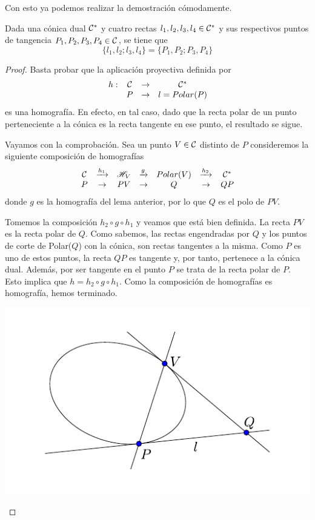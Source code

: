 Con esto ya podemos realizar la demostración cómodamente.
\begin{prop}
		Dada una cónica dual $\mathcal{C}^*$ y cuatro rectas $l_1,l_2,l_3,l_4\in\mathcal{C}^*$ y sus respectivos puntos de tangencia $P_1,P_2,P_3,P_4\in\mathcal{C}$, se tiene que 
		\begin{equation}
		\{l_1,l_2;l_3,l_4\}=\{P_1,P_2;P_3,P_4\}
		\end{equation}
\end{prop}
\begin{proof}
	Basta probar que la aplicación proyectiva definida por
	\begin{equation*}
		\begin{array}{cccc}
			h:&\mathcal{C}&\rightarrow &\mathcal{C}^*\\
			& P&\rightarrow &l=Polar(P)
		\end{array}
	\end{equation*}
	es una homografía. En efecto, en tal caso, dado que la recta polar de un punto perteneciente a la cónica es la recta tangente en ese punto, el resultado se sigue.
	
	Vayamos con la comprobación. Sea un punto $V\in\mathcal{C}$ distinto de $P$ consideremos la siguiente composición de homografías
	\begin{equation*}
		\begin{array}{ccccccc}
			\mathcal{C}&\xrightarrow{h_1}&\mathscr{H}_V&\xrightarrow{g}& Polar(V)&\xrightarrow{h_2}&\mathcal{C}^*\\
			P&\rightarrow &PV&\rightarrow&Q&\rightarrow&QP
		\end{array}
	\end{equation*}
	donde $g$ es la homografía del lema anterior, por lo que $Q$ es el polo de $PV$.
	
	Tomemos la composición $h_2\circ g\circ h_1$ y veamos que está bien definida. La recta $PV$ es la recta polar de $Q$. Como sabemos, las rectas engendradas por $Q$ y los puntos de corte de Polar($Q$) con la cónica, son rectas tangentes a la misma. Como $P$ es uno de estos puntos, la recta $QP$ es tangente y, por tanto, pertenece a la cónica dual. Además, por ser tangente en el punto $P$ se trata de la recta polar de $P$. Esto implica que $h=h_2\circ g\circ h_1$. Como la composición de homografías es homografía, hemos terminado.
	\begin{center}
		\includegraphics[scale=.8]{Graficos/Conicas/RazonDobleDual}
	\end{center}
\end{proof}
